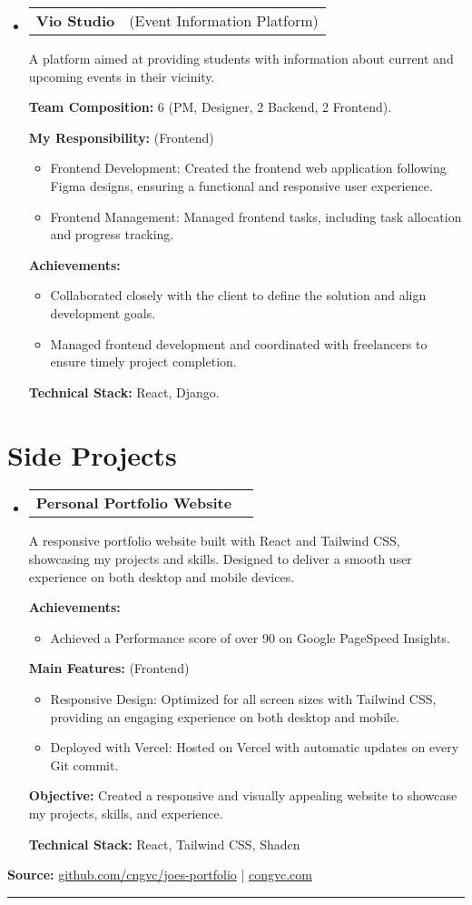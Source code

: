 \documentclass[letterpaper,11pt]{article}
\makeatletter
\newcommand{\resumeProjectTitle}[2]{
  \vspace{-2pt}\item
    \begin{tabular*}{1\textwidth}[t]{l @{\hskip 2pt} r}
      \textbf{#1} & \small #2 \\
    \end{tabular*}\vspace{2pt}
}
\newcommand{\resumeDesc}[1]{
  {#1\\ \vspace{2px}}
}
\newcommand{\resumeItem}[1]{
  \item{#1 \vspace{-2pt}}
}
\newcommand{\resumeItemListTitle}[1]{%
  \vspace{0pt} \textbf{#1} \vspace{-2pt}%
}
\newcommand{\resumeItemListStart}{\vspace{-4pt}\begin{itemize}[leftmargin=12px]}
\newcommand{\resumeItemListEnd}{\end{itemize}\vspace{-5pt}}
\newcommand{\resumeSubHeadingListStart}{\begin{itemize}[leftmargin=0pt, label={}]}
\newcommand{\resumeSubHeadingListEnd}{\end{itemize}\vspace{-8pt}}
\makeatother
\begin{document}
\resumeSubHeadingListStart
\resumeProjectTitle{Vio Studio}{(Event Information Platform)}
\resumeDesc{A platform aimed at providing students with information about current and upcoming events in their vicinity.}
\resumeItemListTitle{Team Composition:} 6 (PM, Designer, 2 Backend, 2 Frontend).
\par
\resumeItemListTitle{My Responsibility:} (Frontend)
\resumeItemListStart
    \resumeItem{Frontend Development: Created the frontend web application following Figma designs, ensuring a functional and responsive user experience.}
    \resumeItem{Frontend Management: Managed frontend tasks, including task allocation and progress tracking.}
\resumeItemListEnd
\resumeItemListTitle{Achievements:}
\resumeItemListStart
    \resumeItem{Collaborated closely with the client to define the solution and align development goals.}
    \resumeItem{Managed frontend development and coordinated with freelancers to ensure timely project completion.}
\resumeItemListEnd
\resumeItemListTitle{Technical Stack:} React, Django.
\resumeSubHeadingListEnd


\section{Side Projects}
\resumeSubHeadingListStart
\resumeProjectTitle{Personal Portfolio Website}{}
\resumeDesc{A responsive portfolio website built with React and Tailwind CSS, showcasing my projects and skills. Designed to deliver a smooth user experience on both desktop and mobile devices.}
\resumeItemListTitle{Achievements:}
\resumeItemListStart
    \resumeItem{Achieved a Performance score of over 90 on Google PageSpeed Insights.}
\resumeItemListEnd
\resumeItemListTitle{Main Features:} (Frontend)
\resumeItemListStart
    \resumeItem{Responsive Design: Optimized for all screen sizes with Tailwind CSS, providing an engaging experience on both desktop and mobile.}
    \resumeItem{Deployed with Vercel: Hosted on Vercel with automatic updates on every Git commit.}
\resumeItemListEnd
\resumeItemListTitle{Objective:} Created a responsive and visually appealing website to showcase my projects, skills, and experience.
\par
\resumeItemListTitle{Technical Stack:} React, Tailwind CSS, Shadcn
\resumeSubHeadingListEnd
\noindent\textbf{Source:} \url{github.com/cngvc/joes-portfolio} | \url{congvc.com}
\noindent\rule{\textwidth}{0.4pt}
\end{document}
